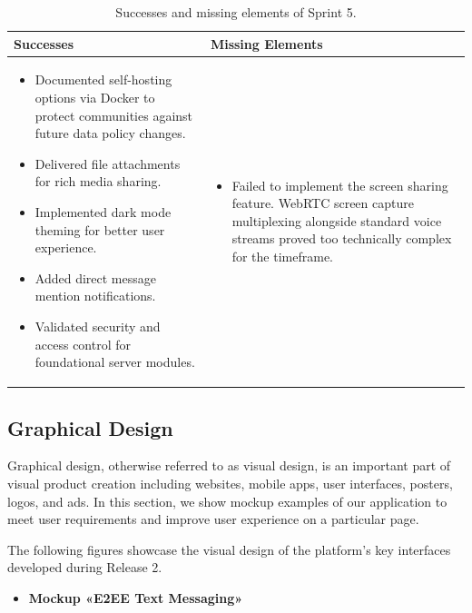 \renewcommand{\arraystretch}{1.5}
\begin{table}[H]
    \centering
    \begin{tabular}{| p{7.5cm} | p{7.5cm} |}
        \hline
        \textbf{Successes} & \textbf{Missing Elements} \\
        \hline
        \begin{itemize}
            \item Documented self-hosting options via Docker to protect communities against future data policy changes.
            \item Delivered file attachments for rich media sharing.
            \item Implemented dark mode theming for better user experience.
            \item Added direct message mention notifications.
            \item Validated security and access control for foundational server modules.
        \end{itemize} & 
        \begin{itemize}
            \item Failed to implement the screen sharing feature. WebRTC screen capture multiplexing alongside standard voice streams proved too technically complex for the timeframe.
        \end{itemize} \\
        \hline
    \end{tabular}
    \caption{Successes and missing elements of Sprint 5.}
    \label{tab:sprint5_retro}
\end{table}
\renewcommand{\arraystretch}{1.0}

\subsection{Graphical Design}
Graphical design, otherwise referred to as visual design, is an important part of visual product creation including websites, mobile apps, user interfaces, posters, logos, and ads.
In this section, we show mockup examples of our application to meet user requirements and improve user experience on a particular page.

The following figures showcase the visual design of the platform's key interfaces developed during Release 2.

\begin{itemize}
\item \textbf{Mockup «E2EE Text Messaging»}
\end{itemize}

